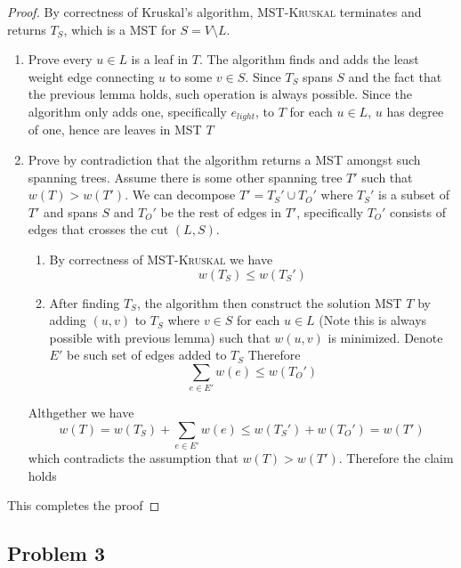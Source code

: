 \documentclass[11pt]{article}
\begin{document}
\begin{enumerate}
\begin{proposition*}
        \begin{proof}
            By correctness of Kruskal's algorithm, \textsc{MST-Kruskal} terminates and returns $T_S$, which is a MST for $S = V\setminus L$.
            \begin{enumerate}
                \item Prove every $u\in L$ is a leaf in $T$. The algorithm finds and adds the least weight edge connecting $u$ to some $v\in S$. Since $T_S$ spans $S$ and the fact that the previous lemma holds, such operation is always possible. Since the algorithm only adds one, specifically $e_{light}$, to $T$ for each $u\in L$, $u$ has degree of one, hence are leaves in MST $T$
                \item Prove by contradiction that the algorithm returns a MST amongst such spanning trees. Assume there is some other spanning tree $T'$ such that $w(T) > w(T')$. We can decompose $T' = T_S' \cup T_O'$ where $T_S'$ is a subset of $T'$ and spans $S$ and $T_O'$ be the rest of edges in $T'$, specifically $T_O'$ consists of edges that crosses the cut $(L, S)$. 
                \begin{enumerate}
                    \item By correctness of \textsc{MST-Kruskal} we have 
                    \[
                        w(T_S) \leq w(T_S')
                    \]
                    \item After finding $T_S$, the algorithm then construct the solution MST $T$ by adding $(u,v)$ to $T_S$ where $v\in S$ for each $u\in L$ (Note this is always possible with previous lemma) such that $w(u,v)$ is minimized. Denote $E'$ be such set of edges added to $T_S$
                    Therefore  
                    \[
                        \sum_{e \in E'} w(e) \leq w(T_O')
                    \]
                \end{enumerate} 
                Althgether we have 
                \[
                    w(T) = w(T_S) + \sum_{e \in E'} w(e) \leq w(T_S') + w(T_O') = w(T')
                \]
                which contradicts the assumption that $w(T) > w(T')$. Therefore the claim holds
            \end{enumerate}
            This completes the proof
        \end{proof}
    \end{proposition*}


\end{enumerate}
    

\subsection*{Problem 3}
\end{document}

